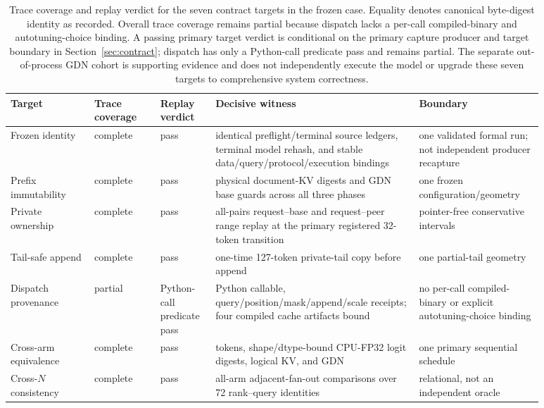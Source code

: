 \documentclass{article}
\begin{document}
\begin{table}[H]
  \caption{Trace coverage and replay verdict for the seven contract targets in
  the frozen case.  Equality denotes canonical byte-digest identity as
  recorded.  Overall trace coverage remains partial because dispatch lacks a
  per-call compiled-binary and autotuning-choice binding.  A passing primary
  target verdict is conditional on the primary capture producer and target
  boundary in Section~\ref{sec:contract}; dispatch has only a Python-call
  predicate pass and remains partial.  The separate out-of-process GDN cohort is
  supporting evidence and does not independently execute the model or upgrade
  these seven targets to comprehensive system correctness.}
  \label{tab:witness}
  \centering
  \scriptsize
  \begin{tabular}{@{}>{\raggedright\arraybackslash}p{0.14\linewidth}p{0.11\linewidth}p{0.09\linewidth}>{\raggedright\arraybackslash}p{0.34\linewidth}>{\raggedright\arraybackslash}p{0.20\linewidth}@{}}
    \toprule
    Target & Trace coverage & Replay verdict & Decisive witness & Boundary \\
    \midrule
    Frozen identity & complete & pass & identical preflight/terminal source ledgers, terminal model rehash, and stable data/query/protocol/execution bindings & one validated formal run; not independent producer recapture \\
    Prefix immutability & complete & pass & physical document-KV digests and GDN base guards across all three phases & one frozen configuration/geometry \\
    Private ownership & complete & pass & all-pairs request--base and request--peer range replay at the primary registered 32-token transition & pointer-free conservative intervals \\
    Tail-safe append & complete & pass & one-time 127-token private-tail copy before append & one partial-tail geometry \\
    Dispatch provenance & partial & Python-call predicate pass & Python callable, query/position/mask/append/scale receipts; four compiled cache artifacts bound & no per-call compiled-binary or explicit autotuning-choice binding \\
    Cross-arm equivalence & complete & pass & tokens, shape/dtype-bound CPU-FP32 logit digests, logical KV, and GDN & one primary sequential schedule \\
    Cross-$N$ consistency & complete & pass & 288 all-arm adjacent-fan-out comparisons over 72 rank--query identities & relational, not an independent oracle \\
    \bottomrule
  \end{tabular}
\end{table}
\end{document}
